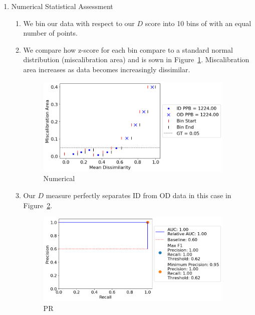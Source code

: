 \begin{enumerate}
    \item Numerical Statistical Assessment

    \begin{enumerate}
        \item We bin our data with respect to our $D$ score into 10 bins of with an equal number of points.

        \item We compare how z-score for each bin compare to a standard normal distribution (miscalibration area) and is sown in Figure~\ref{diffusion_stat}. Miscalibration area increases as data becomes increasingly dissimilar.

        \begin{figure}[H]
        \centering
        \includegraphics[width=0.95\textwidth]{figures/diffusion_stat.png}
        \caption{Numerical}
        \label{diffusion_stat}
        \end{figure}

        \item Our $D$ measure perfectly separates ID from OD data in this case in Figure~\ref{diffusion_stat_pr}.

        \begin{figure}[H]
        \centering
        \includegraphics[width=0.95\textwidth]{figures/diffusion_stat_pr.png}
        \caption{PR}
        \label{diffusion_stat_pr}
        \end{figure}
        
    \end{enumerate}
    
\end{enumerate}

